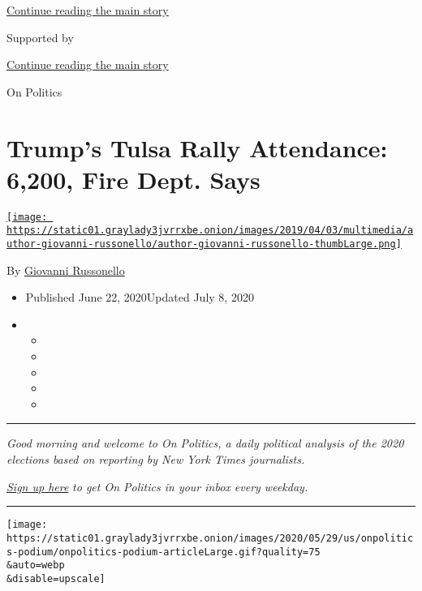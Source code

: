 \protect\hyperlink{after-top}{Continue reading the main story}

Supported by

\protect\hyperlink{after-sponsor}{Continue reading the main story}

On Politics

\hypertarget{trumps-tulsa-rally-attendance-6200-fire-dept-says}{%
\section{Trump's Tulsa Rally Attendance: 6,200, Fire Dept.
Says}\label{trumps-tulsa-rally-attendance-6200-fire-dept-says}}

\href{https://www.nytimes3xbfgragh.onion/by/giovanni-russonello}{\texttt{[image: https://static01.graylady3jvrrxbe.onion/images/2019/04/03/multimedia/author-giovanni-russonello/author-giovanni-russonello-thumbLarge.png]}}

By
\href{https://www.nytimes3xbfgragh.onion/by/giovanni-russonello}{Giovanni
Russonello}

\begin{itemize}
\item
  Published June 22, 2020Updated July 8, 2020
\item
  \begin{itemize}
  \item
  \item
  \item
  \item
  \item
  \end{itemize}
\end{itemize}

\begin{center}\rule{0.5\linewidth}{\linethickness}\end{center}

\emph{Good morning and welcome to On Politics, a daily political
analysis of the 2020 elections based on reporting by New York Times
journalists.}

\href{https://www.nytimes3xbfgragh.onion/newsletters/politics?module=inline}{\emph{Sign
up here}} \emph{to get On Politics in your inbox every weekday.}

\begin{center}\rule{0.5\linewidth}{\linethickness}\end{center}

\texttt{[image: https://static01.graylady3jvrrxbe.onion/images/2020/05/29/us/onpolitics-podium/onpolitics-podium-articleLarge.gif?quality=75\\\&auto=webp\\\&disable=upscale]}

